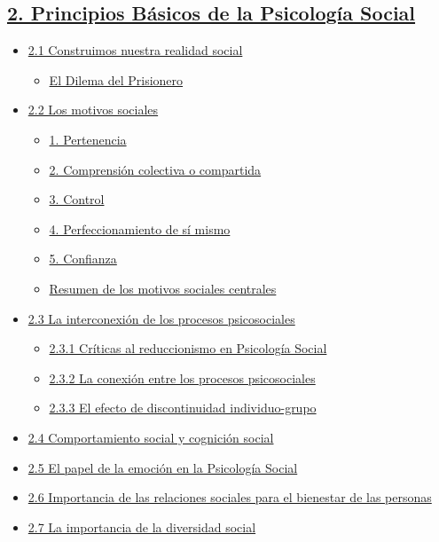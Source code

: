 \documentclass[
]{website}
\providecommand{\tightlist}{%
  \setlength{\itemsep}{0pt}\setlength{\parskip}{0pt}}
\begin{document}
\subsection*{\texorpdfstring{\hyperref[tema2]{2. Principios Básicos de la Psicología Social}}{2. Principios Básicos de la Psicología Social}}\label{principios-buxe1sicos-de-la-psicologuxeda-social}

\begin{itemize}
\tightlist
\item
  \hyperref[subtema2_1]{2.1 Construimos nuestra realidad social}

  \begin{itemize}
  \tightlist
  \item
    \hyperref[cuadro2_1]{El Dilema del Prisionero}
  \end{itemize}
\item
  \hyperref[subtema2_2]{2.2 Los motivos sociales}

  \begin{itemize}
  \tightlist
  \item
    \hyperref[subtema2_2_1]{1. Pertenencia}
  \item
    \hyperref[subtema2_2_2]{2. Comprensión colectiva o compartida}
  \item
    \hyperref[subtema2_2_3]{3. Control}
  \item
    \hyperref[subtema2_2_4]{4. Perfeccionamiento de sí mismo}
  \item
    \hyperref[subtema2_2_5]{5. Confianza}
  \item
    \hyperref[subtema2_2_6]{Resumen de los motivos sociales centrales}
  \end{itemize}
\item
  \hyperref[subtema2_3]{2.3 La interconexión de los procesos psicosociales}

  \begin{itemize}
  \tightlist
  \item
    \hyperref[subtema2_3_1]{2.3.1 Críticas al reduccionismo en Psicología Social}
  \item
    \hyperref[subtema2_3_2]{2.3.2 La conexión entre los procesos psicosociales}
  \item
    \hyperref[subtema2_3_3]{2.3.3 El efecto de discontinuidad individuo-grupo}
  \end{itemize}
\item
  \hyperref[subtema2_4]{2.4 Comportamiento social y cognición social}
\item
  \hyperref[subtema2_5]{2.5 El papel de la emoción en la Psicología Social}
\item
  \hyperref[subtema2_6]{2.6 Importancia de las relaciones sociales para el bienestar de las personas}
\item
  \hyperref[subtema2_7]{2.7 La importancia de la diversidad social}
\end{itemize}
\end{document}
